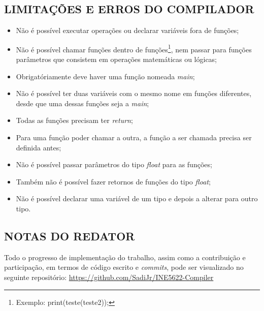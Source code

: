 	\subsection{\normalsize LIMITAÇÕES E ERROS DO COMPILADOR}
	\begin{itemize}
		\item Não é possível executar operações ou declarar variáveis fora de funções;
		\item Não é possível chamar funções dentro de funções\footnote{Exemplo: print(teste(teste2));}, nem passar para funções parâmetros que consistem em operações matemáticas ou lógicas;
		\item Obrigatóriamente deve haver uma função nomeada \textit{main};
		\item Não é possível ter duas variáveis com o mesmo nome em funções diferentes, desde que uma dessas funções seja a \textit{main};
		\item Todas as funções precisam ter \textit{return};
		\item Para uma função poder chamar a outra, a função a ser chamada precisa ser definida antes;
		\item Não é possível passar parâmetros do tipo \textit{float} para as funções;
		\item Também não é possível fazer retornos de funções do tipo \textit{float};
		\item Não é possível declarar uma variável de um tipo e depois a alterar para outro tipo.
	\end{itemize}
	
	\subsection{\normalsize NOTAS DO REDATOR}
	Todo o progresso de implementação do trabalho, assim como a contribuição e participação, em termos de código escrito e \textit{commits}, pode ser visualizado no seguinte repositório: \url{https://github.com/SadiJr/INE5622-Compiler}